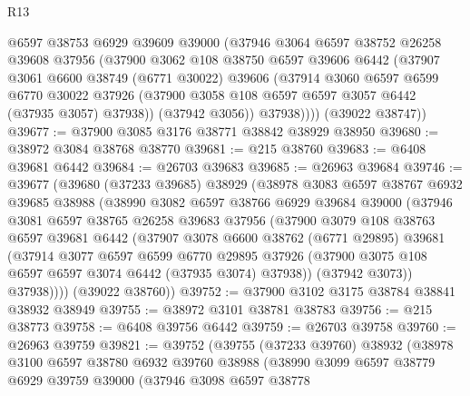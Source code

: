 \begin{lexlean}{R13}
\begin{coremodule}
          @6597
          @38753
          @6929
          @39609
          @39000
          (@37946
            @3064
            @6597
            @38752
            @26258
            @39608
            @37956
            (@37900
              @3062
              @108
              @38750
              @6597
              @39606
              @6442
              (@37907
                @3061
                @6600
                @38749
                (@6771 @30022)
                @39606
                (@37914
                  @3060
                  @6597
                  @6599
                  @6770
                  @30022
                  @37926
                  (@37900 @3058 @108 @6597 @6597 @3057 @6442 (@37935 @3057) @37938))
                (@37942 @3056))
              @37938))))
      (@39022 @38747))
@39677 := @37900 @3085 @3176 @38771 @38842 @38929 @38950
@39680 := @38972 @3084 @38768 @38770
@39681 := @215 @38760
@39683 := @6408 @39681 @6442
@39684 := @26703 @39683
@39685 := @26963 @39684
@39746 := @39677
    (@39680
      (@37233 @39685)
      @38929
      (@38978
        @3083
        @6597
        @38767
        @6932
        @39685
        @38988
        (@38990
          @3082
          @6597
          @38766
          @6929
          @39684
          @39000
          (@37946
            @3081
            @6597
            @38765
            @26258
            @39683
            @37956
            (@37900
              @3079
              @108
              @38763
              @6597
              @39681
              @6442
              (@37907
                @3078
                @6600
                @38762
                (@6771 @29895)
                @39681
                (@37914
                  @3077
                  @6597
                  @6599
                  @6770
                  @29895
                  @37926
                  (@37900 @3075 @108 @6597 @6597 @3074 @6442 (@37935 @3074) @37938))
                (@37942 @3073))
              @37938))))
      (@39022 @38760))
@39752 := @37900 @3102 @3175 @38784 @38841 @38932 @38949
@39755 := @38972 @3101 @38781 @38783
@39756 := @215 @38773
@39758 := @6408 @39756 @6442
@39759 := @26703 @39758
@39760 := @26963 @39759
@39821 := @39752
    (@39755
      (@37233 @39760)
      @38932
      (@38978
        @3100
        @6597
        @38780
        @6932
        @39760
        @38988
        (@38990
          @3099
          @6597
          @38779
          @6929
          @39759
          @39000
          (@37946
            @3098
            @6597
            @38778

\end{coremodule}
\end{lexlean}
